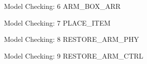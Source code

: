 \documentclass{beamer}
\begin{document}
\begin{frame}[containsverbatim]{Model Checking: 6 ARM\_BOX\_ARR}
\begin{figure}[htbp]
  \centering
  
\end{figure}
\end{frame}


\begin{frame}[containsverbatim]{Model Checking: 7 PLACE\_ITEM}
\begin{figure}[htbp]
  \centering
  
\end{figure}
\end{frame}


\begin{frame}[containsverbatim]{Model Checking: 8 RESTORE\_ARM\_PHY}
\begin{figure}[htbp]
  \centering
  
\end{figure}
\end{frame}


\begin{frame}[containsverbatim]{Model Checking: 9 RESTORE\_ARM\_CTRL}
\begin{figure}[htbp]
  \centering
  
\end{figure}
\end{frame}
\end{document}
